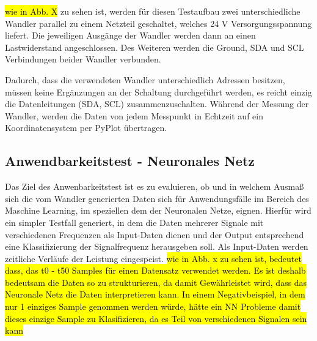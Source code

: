 \hl{wie in Abb. X} zu sehen ist, werden für diesen Testaufbau zwei unterschiedliche Wandler parallel zu einem Netzteil geschaltet, welches 24 V Versorgungsspannung liefert. Die jeweiligen Ausgänge der Wandler werden dann an einen Lastwiderstand angeschlossen. Des Weiteren werden die Ground, SDA und SCL Verbindungen beider Wandler verbunden.

Dadurch, dass die verwendeten Wandler unterschiedlich Adressen besitzen, müssen keine Ergänzungen an der Schaltung durchgeführt werden, es reicht einzig die Datenleitungen (SDA, SCL) zusammenzuschalten. Während der Messung der Wandler, werden die Daten von jedem Messpunkt in Echtzeit auf ein Koordinatensystem per PyPlot übertragen.


\subsection{Anwendbarkeitstest - Neuronales Netz}

Das Ziel des Anwenbarkeitstest ist es zu evaluieren, ob und in welchem Ausmaß sich die vom Wandler generierten Daten sich für Anwendungsfälle im Bereich des Maschine Learning, im speziellen dem der Neuronalen Netze, eignen. Hierfür wird ein simpler Testfall generiert, in dem die Daten mehrerer Signale mit verschiedenen Frequenzen als Input-Daten dienen und der Output entsprechend eine Klassifizierung der Signalfrequenz herausgeben soll. Als Input-Daten werden zeitliche Verläufe der Leistung eingespeist. \hl{wie in Abb. x zu sehen ist, bedeutet dass, das t0 - t50 Samples für einen Datensatz verwendet werden. Es ist deshalb bedeutsam die Daten so zu strukturieren, da damit Gewährleistet wird, dass das Neuronale Netz die Daten interpretieren kann. In einem Negativbeispiel, in dem nur 1 einziges Sample genommen werden würde, hätte ein NN Probleme damit dieses einzige Sample zu Klasifizieren, da es Teil von verschiedenen Signalen sein kann}

